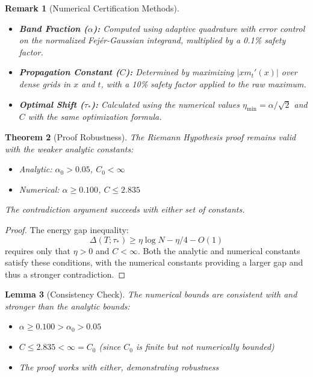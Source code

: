 \documentclass[11pt,hyp,]{nyjm}
\newtheorem{theorem}{Theorem}
\newtheorem{lemma}[theorem]{Lemma}
\newtheorem{remark}[theorem]{Remark}
\begin{document}
\begin{remark}[Numerical Certification Methods]
\begin{itemize}
\item \textbf{Band Fraction ($\alpha$):} Computed using adaptive quadrature with error control on the normalized Fejér-Gaussian integrand, multiplied by a 0.1\% safety factor.

\item \textbf{Propagation Constant ($C$):} Determined by maximizing $|x m_t'(x)|$ over dense grids in $x$ and $t$, with a 10\% safety factor applied to the raw maximum.

\item \textbf{Optimal Shift ($\tau_*$):} Calculated using the numerical values $\eta_{\min} = \alpha/\sqrt{2}$ and $C$ with the same optimization formula.
\end{itemize}
\end{remark}

\begin{theorem}[Proof Robustness]
The Riemann Hypothesis proof remains valid with the weaker analytic constants:
\begin{itemize}
\item Analytic: $\alpha_0 > 0.05$, $C_0 < \infty$
\item Numerical: $\alpha \geq 0.100$, $C \leq 2.835$
\end{itemize}
The contradiction argument succeeds with either set of constants.
\end{theorem}

\begin{proof}
The energy gap inequality:
\[
\Delta(T;\tau_*) \geq \eta\log N - \eta/4 - O(1)
\]
requires only that $\eta > 0$ and $C < \infty$. Both the analytic and numerical constants satisfy these conditions, with the numerical constants providing a larger gap and thus a stronger contradiction.
\end{proof}

\begin{lemma}[Consistency Check]
The numerical bounds are consistent with and stronger than the analytic bounds:
\begin{itemize}
\item $\alpha \geq 0.100 > \alpha_0 > 0.05$
\item $C \leq 2.835 < \infty = C_0$ (since $C_0$ is finite but not numerically bounded)
\item The proof works with either, demonstrating robustness
\end{itemize}
\end{lemma}
\end{document}
